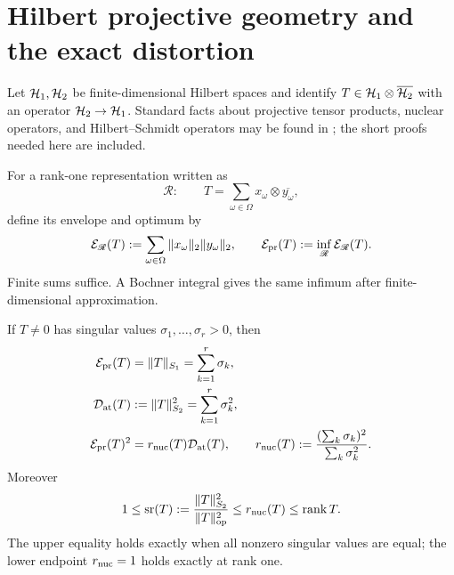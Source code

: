 \section{Hilbert projective geometry and the exact distortion}
\label{sec:tpc49-Hilbert-geometry}

Let \(\mathcal H_1,\mathcal H_2\) be finite-dimensional Hilbert spaces and identify
\(T\in\mathcal H_1\otimes\overline{\mathcal H_2}\) with an operator
\(\mathcal H_2\to\mathcal H_1\).  Standard facts about projective tensor products,
nuclear operators, and Hilbert--Schmidt operators may be found in
\citep{Ryan2002,HornJohnson2013,Simon2005}; the short
proofs needed here are included.

\begin{definition}
\label{def:tpc49-Hilbert-envelope}
For a rank-one representation written as
\begin{equation}
 \mathscr R:\qquad
 T=\sum_{\omega\in\Omega}
 x_\omega\otimes\overline{y_\omega},
 \label{eq:tpc49-rank-one-representation}
\end{equation}
define its envelope and optimum by
\begin{equation}
 \mathcal E_{\mathscr R}(T)
 :=\sum_{\omega\in\Omega}
 \|x_\omega\|_2\|y_\omega\|_2,
 \qquad
 \mathcal E_{\rm pr}(T):=\inf_{\mathscr R}\mathcal E_{\mathscr R}(T).
 \label{eq:tpc49-Hilbert-envelope}
\end{equation}
Finite sums suffice.  A Bochner integral gives the same infimum after
finite-dimensional approximation.
\end{definition}

\begin{theorem}
\label{thm:tpc49-Hilbert-projective}
If \(T\ne0\) has singular values \(\sigma_1,\ldots,\sigma_r>0\), then
\begin{align}
 \mathcal E_{\rm pr}(T)&=\|T\|_{S_1}=\sum_{k=1}^r\sigma_k,
 \label{eq:tpc49-projective-equals-nuclear}\\
 \mathcal D_{\rm at}(T)&:=\|T\|_{S_2}^2=\sum_{k=1}^r\sigma_k^2,
 \label{eq:tpc49-atomic-is-Frobenius}\\
 \mathcal E_{\rm pr}(T)^2
 &=r_{\rm nuc}(T)\mathcal D_{\rm at}(T),
 \qquad
 r_{\rm nuc}(T)
 :=\frac{(\sum_k\sigma_k)^2}{\sum_k\sigma_k^2}.
 \label{eq:tpc49-nuclear-participation-rank}
\end{align}
Moreover
\begin{equation}
 1\le \operatorname{sr}(T)
 :=\frac{\|T\|_{S_2}^2}{\|T\|_{\rm op}^2}
 \le r_{\rm nuc}(T)
 \le\operatorname{rank}T.
 \label{eq:tpc49-effective-rank-chain}
\end{equation}
The upper equality holds exactly when all nonzero singular values are
equal; the lower endpoint \(r_{\rm nuc}=1\) holds exactly at rank one.
\end{theorem}

